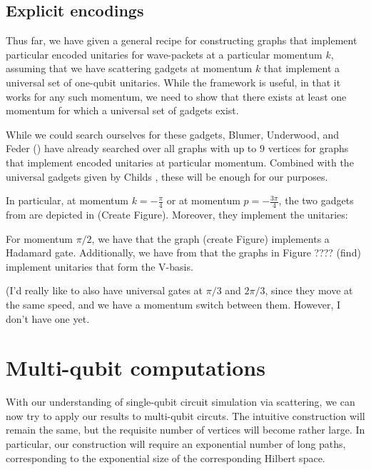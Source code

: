 \documentclass[../thesis-main/thesis-main]{subfiles}
\begin{document}
\subsection{Explicit encodings}\label{sec:explicit_encodings}


Thus far, we have given a general recipe for constructing graphs that implement particular encoded unitaries for wave-packets at a particular momentum $k$, assuming that we have scattering gadgets at momentum $k$ that implement a universal set of one-qubit unitaries.  While the framework is useful, in that it works for any such momentum, we need to show that there exists at least one momentum for which a universal set of gadgets exist.  

While we could search ourselves for these gadgets, Blumer, Underwood, and Feder (\cite{BUF11}) have already searched over all graphs with up to $9$ vertices for graphs that implement encoded unitaries at particular momentum.  Combined with the universal gadgets given by Childs \cite{Chi09}, these will be enough for our purposes.

In particular, at momentum $k = -\frac{\pi}{4}$ or at momentum $p = - \frac{3\pi}{4}$, the two gadgets from \cite{Chi09} are depicted in 
(Create Figure).  Moreover, they implement the unitaries:

For momentum $\pi/2$, we have that the graph (create Figure) implements a Hadamard gate.  Additionally, we have from \cite{BUF11} that the graphs in Figure ???? (find) implement unitaries that form the V-basis.

(I'd really like to also have universal gates at $\pi/3$ and $2\pi/3$, since they move at the same speed, and we have a momentum switch between them.  However, I don't have one yet.




\section{Multi-qubit computations}
\label{sec:multi_qubit_computations}

With our understanding of single-qubit circuit simulation via scattering, we can now try to apply our results to multi-qubit circuts.  The intuitive construction will remain the same, but the requisite number of vertices will become rather large.  In particular, our construction will require an exponential number of long paths, corresponding to the exponential size of the corresponding Hilbert space.
\end{document}
